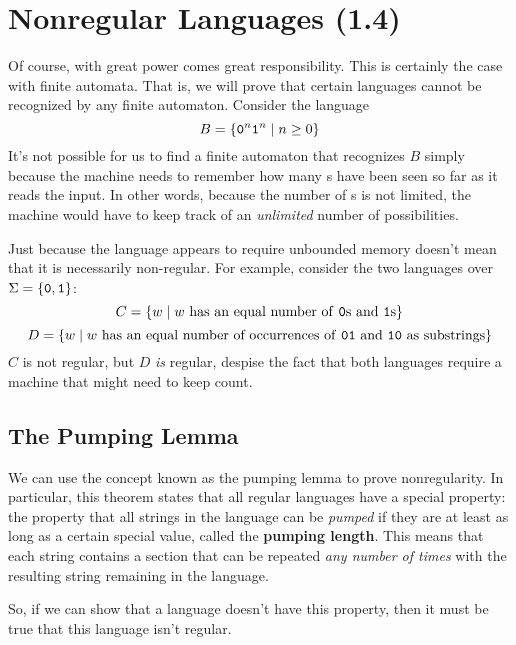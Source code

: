 \documentclass[letterpaper]{article}
\begin{document}
\section{Nonregular Languages (1.4)}
Of course, with great power comes great responsibility. This is certainly the case with finite automata. That is, we will prove that certain languages cannot be recognized by any finite automaton. Consider the language
\[B = \{\texttt{0}^n \texttt{1}^n \mid n \geq 0\}\]
It's not possible for us to find a finite automaton that recognizes $B$ simply because the machine needs to remember how many s have been seen so far as it reads the input. In other words, because the number of s is not limited, the machine would have to keep track of an \emph{unlimited} number of possibilities.

\begin{note}{}{}
    Just because the language appears to require unbounded memory doesn't mean that it is necessarily non-regular. For example, consider the two languages over $\Sigma = \{\texttt{0}, \texttt{1}\}$: 
    \[C = \{w \mid w \text{ has an equal number of \texttt{0}s and \texttt{1}s}\}\]
    \[D = \{w \mid w \text{ has an equal number of occurrences of \texttt{01} and \texttt{10} as substrings}\}\]
    $C$ is not regular, but $D$ \emph{is} regular, despise the fact that both languages require a machine that might need to keep count. 
\end{note}

\subsection{The Pumping Lemma}
We can use the concept known as the pumping lemma to prove nonregularity. In particular, this theorem states that all regular languages have a special property: the property that all strings in the language can be \emph{pumped} if they are at least as long as a certain special value, called the \textbf{pumping length}. This means that each string contains a section that can be repeated \emph{any number of times} with the resulting string remaining in the language. 

\bigskip 

So, if we can show that a language doesn't have this property, then it must be true that this language isn't regular. 
\end{document}
